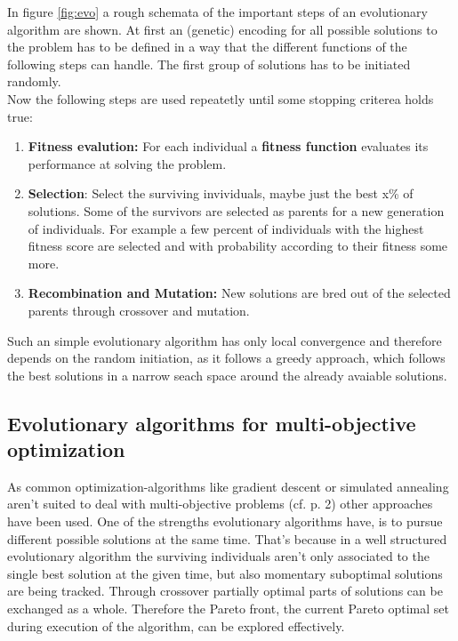 \documentclass[12pt,twoside]{article}
\theoremstyle{plain}
\theoremstyle{definition}
\theoremstyle{remark}
\begin{document}
In figure \ref{fig:evo} a rough schemata of the important steps of an evolutionary algorithm are shown. At first an (genetic) encoding for all possible solutions to the problem has to be defined in a way that the different functions of the following steps can handle. The first group of solutions has to be initiated randomly.\\

Now the following steps are used repeatetly until some stopping criterea holds true:
\begin{enumerate}
	\item \textbf{Fitness evalution:} For each individual a \textbf{fitness function} evaluates its performance at solving the problem.
	\item \textbf{Selection}: Select the surviving invividuals, maybe just the best x\% of solutions. Some of the survivors are selected as parents for a new generation of individuals. For example a few percent of individuals with the highest fitness score are selected and with probability according to their fitness some more.
	\item \textbf{Recombination and Mutation:} New solutions are bred out of the selected parents through crossover and mutation.
\end{enumerate}

Such an simple evolutionary algorithm has only local convergence and therefore depends on the random initiation, as it follows a greedy approach, which follows the best solutions in a narrow seach space around the already avaiable solutions.

\subsection{Evolutionary algorithms for multi-objective optimization}
\label{back:evo_in_multi-opt}
As common optimization-algorithms like gradient descent or simulated annealing aren't suited to deal with multi-objective problems (cf. \cite{fonseca1995overview} p. 2) other approaches have been used.
One of the strengths evolutionary algorithms have, is to pursue different possible solutions at the same time. That's because in a well structured evolutionary algorithm the surviving individuals aren't only associated to the single best solution at the given time, but also momentary suboptimal solutions are being tracked.
Through crossover partially optimal parts of solutions can be exchanged as a whole. 
Therefore the Pareto front, the current Pareto optimal set during execution of the algorithm, can be explored effectively.
\end{document}

